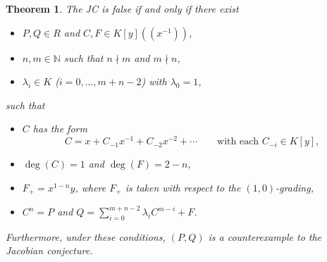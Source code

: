 \documentclass[reqno,a4paper]{amsart}
\newtheorem{theorem}{Theorem}[section]
\theoremstyle{definition}
\theoremstyle{remark}
\begin{document}
\begin{theorem}\label{principal} The JC is false if and only if there exist

\begin{itemize}

\smallskip

\item[-] $P,Q\in R$ and $C,F\in K[y]((x^{-1}))$,

\smallskip

\item[-] $n,m\in \mathds{N}$ such that $n\nmid m$ and $m\nmid n$,

\smallskip

\item[-] $\lambda_i\in K$ ($i=0,\dots,m+n-2$) with $\lambda_0=1$,

\smallskip

\end{itemize}
such that
\begin{itemize}

\smallskip

\item[-] $C$ has the form
$$
C = x + C_{-1}x^{-1}+ C_{-2}x^{-2} + \cdots \qquad\text{with each $C_{-i}\in K[y]$,}
$$

\smallskip

\item[-] $\deg(C)=1$ and $\deg(F)=2-n$,

\smallskip

\item[-] $F_+=x^{1-n}y$, where $F_+$ is taken with respect to the $(1,0)$-grading,

\smallskip

\item[-] $C^n=P$ and $Q=\sum_{i=0}^{m+n-2}\lambda_i C^{m-i}+F$.

\smallskip

\end{itemize}
Furthermore, under these conditions, $(P,Q)$ is a counterexample to the Jacobian conjecture.

\end{theorem}
\end{document}
